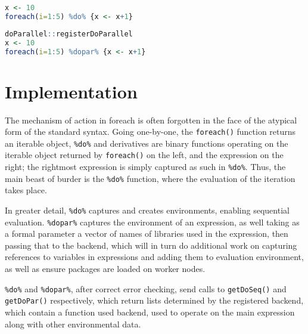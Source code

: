 \documentclass[a4paper,10pt]{article}
\begin{document}
\begin{lstlisting}[float,language=R,caption={Serial Iteration},label=lst:serial]
x <- 10
foreach(i=1:5) %do% {x <- x+1}
\end{lstlisting}
\begin{lstlisting}[float,language=R,caption={Parallel Iteration},label=lst:parallel]
doParallel::registerDoParallel
x <- 10
foreach(i=1:5) %dopar% {x <- x+1}
\end{lstlisting}

\section{Implementation}
\label{sec:implementation}

The mechanism of action in foreach is often forgotten in the face of
the atypical form of the standard syntax. Going one-by-one, the
\texttt{foreach()} function returns an iterable object,
\texttt{\%do\%} and derivatives are binary functions operating on the
iterable object returned by \texttt{foreach()} on the left, and the
expression on the right; the rightmost expression is simply captured
as such in \texttt{\%do\%}. Thus, the main beast of burder is the
\texttt{\%do\%} function, where the evaluation of the iteration takes
place.

In greater detail, \texttt{\%do\%} captures and creates environments, enabling
sequential evaluation. \texttt{\%dopar\%} captures the environment of an
expression, as well taking as a formal parameter a vector of names of libraries
used in the expression, then passing that to the backend, which will in turn do
additional work on capturing references to variables in expressions and adding
them to evaluation environment, as well as ensure packages are loaded on worker
nodes.

\texttt{\%do\%} and \texttt{\%dopar\%}, after correct error checking,
send calls to \texttt{getDoSeq()} and \texttt{getDoPar()}
respectively, which return lists determined by the registered backend,
which contain a function used backend, used to operate on the main
expression along with other environmental data.
\end{document}
